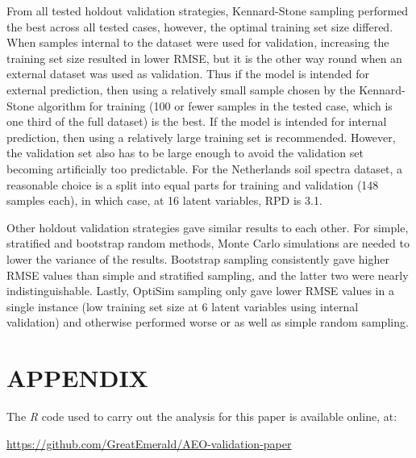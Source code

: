 \documentclass{isprs}
\begin{document}
From all tested holdout validation strategies, Kennard-Stone sampling performed the best across all tested cases, however, the optimal training set size differed. When samples internal to the dataset were used for validation, increasing the training set size resulted in lower RMSE, but it is the other way round when an external dataset was used as validation. Thus if the model is intended for external prediction, then using a relatively small sample chosen by the Kennard-Stone algorithm for training (100 or fewer samples in the tested case, which is one third of the full dataset) is the best. If the model is intended for internal prediction, then using a relatively large training set is recommended. However, the validation set also has to be large enough to avoid the validation set becoming artificially too predictable. For the Netherlands soil spectra dataset, a reasonable choice is a split into equal parts for training and validation (148 samples each), in which case, at 16 latent variables, RPD is 3.1.

Other holdout validation strategies gave similar results to each other. For simple, stratified and bootstrap random methods, Monte Carlo simulations are needed to lower the variance of the results. Bootstrap sampling consistently gave higher RMSE values than simple and stratified sampling, and the latter two were nearly indistinguishable. Lastly, OptiSim sampling only gave lower RMSE values in a single instance (low training set size at 6 latent variables using internal validation) and otherwise performed worse or as well as simple random sampling.

{%
	\begin{spacing}{0.9}%
		
	\end{spacing}
}

\section*{APPENDIX}\label{APPENDIX}

The \textit{R} code used to carry out the analysis for this paper is available online, at:

\url{https://github.com/GreatEmerald/AEO-validation-paper}
\end{document}
